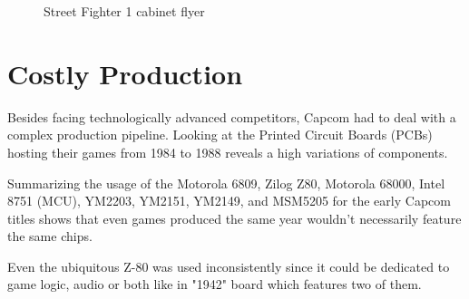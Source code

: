 \begin{figure}[H]
\caption*{Street Fighter 1 cabinet flyer}
\end{figure}


\section{Costly Production}
Besides facing technologically advanced competitors, Capcom had to deal with a complex production pipeline. Looking at the Printed Circuit Boards (PCBs) hosting their games from 1984 to 1988 reveals a high variations of components.

Summarizing the usage of the Motorola 6809, Zilog Z80, Motorola 68000, Intel 8751 (MCU), YM2203, YM2151, YM2149, and MSM5205 for the early Capcom titles shows that even games produced the same year wouldn't necessarily feature the same chips. 

Even the ubiquitous Z-80 was used inconsistently since it could be dedicated to game logic, audio or both like in "1942" board which features two of them.



